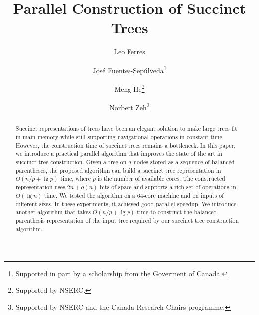 \documentclass[runningheads]{llncs}
\begin{document}
\title{Parallel Construction of Succinct Trees}

\author{Leo Ferres
  \and
  Jos\'e Fuentes-Sep\'ulveda\fnmsep\thanks{Supported
    in part by a scholarship from the Goverment of Canada.}
  \and
  Meng He\fnmsep\thanks{Supported by NSERC.}
  \and
  Norbert Zeh\fnmsep\thanks{Supported by NSERC and the Canada Research
    Chairs programme.}}




\maketitle

\begin{abstract}
  Succinct representations of trees have been an elegant solution to make large
  trees fit in main memory while still supporting navigational operations in
  constant time.
  However, the construction time of succinct trees remains a bottleneck.
  In this paper, we introduce a practical parallel algorithm that improves the
  state of the art in succinct tree construction.
  Given a tree on $n$ nodes stored as a sequence of balanced parentheses, the
  proposed algorithm can build a succinct tree representation in $O(n/p+\lg p)$
  time, where $p$ is the number of available cores.
  The constructed representation uses $2n + o(n)$
  bits of space and supports a rich set of operations in $O(\lg n)$ time.
  We tested the algorithm on a $64$-core machine and on inputs of different
  sizes.
  In these experiments, it achieved good parallel speedup.
  We introduce another algorithm that takes $O(n/p + \lg p)$ time to construct
  the balanced parenthesis representation of the input tree required by our
  succinct tree construction algorithm.
\end{abstract}
%

\end{document}
